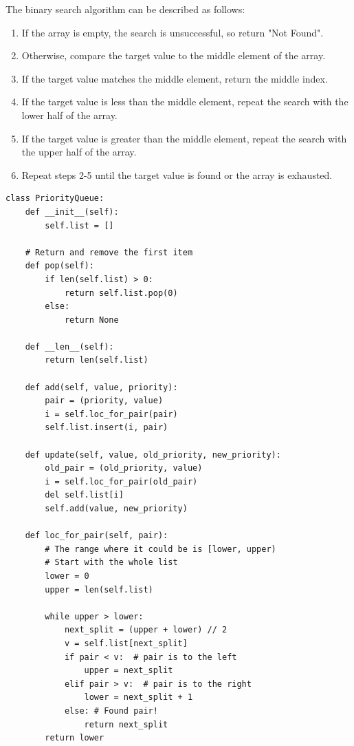The binary search algorithm can be described as follows:
\begin{enumerate}
\item If the array is empty, the search is unsuccessful, so return "Not Found".
\item Otherwise, compare the target value to the middle element of the array.
\item If the target value matches the middle element, return the middle index.
\item If the target value is less than the middle element, repeat the search with the lower half of the array.
\item If the target value is greater than the middle element, repeat the search with the upper half of the array.
\item Repeat steps 2-5 until the target value is found or the array is exhausted.
\end{enumerate}


\begin{verbatim}
class PriorityQueue:
    def __init__(self):
        self.list = []

    # Return and remove the first item
    def pop(self):
        if len(self.list) > 0:
            return self.list.pop(0)
        else:
            return None

    def __len__(self):
        return len(self.list)

    def add(self, value, priority):
        pair = (priority, value)
        i = self.loc_for_pair(pair)
        self.list.insert(i, pair)

    def update(self, value, old_priority, new_priority):
        old_pair = (old_priority, value)
        i = self.loc_for_pair(old_pair)
        del self.list[i]
        self.add(value, new_priority)

    def loc_for_pair(self, pair):
        # The range where it could be is [lower, upper)
        # Start with the whole list
        lower = 0
        upper = len(self.list)

        while upper > lower:
            next_split = (upper + lower) // 2
            v = self.list[next_split]
            if pair < v:  # pair is to the left
                upper = next_split
            elif pair > v:  # pair is to the right
                lower = next_split + 1
            else: # Found pair!
                return next_split
        return lower
\end{verbatim}


